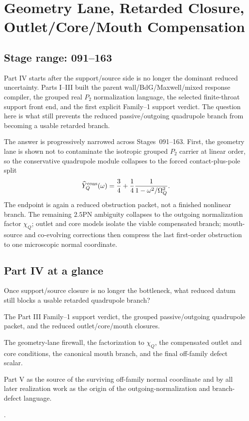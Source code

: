 
\chapter{Geometry Lane, Retarded Closure, Outlet/Core/Mouth Compensation}
\label{chap:part04_geometry_retarded_mouth}

\section*{Stage range: 091--163}

Part IV starts after the support/source side is no longer the dominant reduced uncertainty.  Parts I--III built the parent wall/BdG/Maxwell/mixed response compiler, the grouped real \(P_2\) normalization language, the selected finite-throat support front end, and the first explicit Family--1 support verdict.  The question here is what still prevents the reduced passive/outgoing quadrupole branch from becoming a usable retarded branch.

The answer is progressively narrowed across Stages~091--163.  First, the geometry lane is shown not to contaminate the isotropic grouped \(P_2\) carrier at linear order, so the conservative quadrupole module collapses to the forced contact-plus-pole split
\begin{equation}
\label{eq:part04-intro-3quarter-module}
\widehat Y_Q^{\rm cons}(\omega)
=
\frac34+\frac14\frac{1}{1-\omega^2/\Omega_Q^2}.
\end{equation}
The endpoint is again a reduced obstruction packet, not a finished nonlinear branch.  The remaining \(2.5\)PN ambiguity collapses to the outgoing normalization factor \(\chi_Q\); outlet and core models isolate the viable compensated branch; mouth-source and co-evolving corrections then compress the last first-order obstruction to one microscopic normal coordinate.

\section*{Part IV at a glance}

\begin{readermap}
\item[Primary question] Once support/source closure is no longer the bottleneck, what reduced datum still blocks a usable retarded quadrupole branch?
\item[Starting inputs] The Part III Family--1 support verdict, the grouped passive/outgoing quadrupole packet, and the reduced outlet/core/mouth closures.
\item[Delivers] The geometry-lane firewall, the factorization to \(\chi_Q\), the compensated outlet and core conditions, the canonical mouth branch, and the final off-family defect scalar.
\item[Used by] Part V as the source of the surviving off-family normal coordinate and by all later realization work as the origin of the outgoing-normalization and branch-defect language.
\item[Result anchors] .
\end{readermap}

